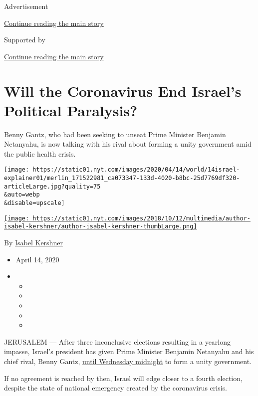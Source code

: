 Advertisement

\protect\hyperlink{after-top}{Continue reading the main story}

Supported by

\protect\hyperlink{after-sponsor}{Continue reading the main story}

\hypertarget{will-the-coronavirus-end-israels-political-paralysis}{%
\section{Will the Coronavirus End Israel's Political
Paralysis?}\label{will-the-coronavirus-end-israels-political-paralysis}}

Benny Gantz, who had been seeking to unseat Prime Minister Benjamin
Netanyahu, is now talking with his rival about forming a unity
government amid the public health crisis.

\texttt{[image: https://static01.nyt.com/images/2020/04/14/world/14israel-explainer01/merlin\_171522981\_ca073347-133d-4020-b8bc-25d7769df320-articleLarge.jpg?quality=75\\\&auto=webp\\\&disable=upscale]}

\href{https://www.nytimes.com/by/isabel-kershner}{\texttt{[image: https://static01.nyt.com/images/2018/10/12/multimedia/author-isabel-kershner/author-isabel-kershner-thumbLarge.png]}}

By \href{https://www.nytimes.com/by/isabel-kershner}{Isabel Kershner}

\begin{itemize}
\item
  April 14, 2020
\item
  \begin{itemize}
  \item
  \item
  \item
  \item
  \item
  \end{itemize}
\end{itemize}

JERUSALEM --- After three inconclusive elections resulting in a yearlong
impasse, Israel's president has given Prime Minister Benjamin Netanyahu
and his chief rival, Benny Gantz,
\href{https://www.nytimes.com/2020/04/13/world/middleeast/israel-election-netanyahu-gantz.html?action=click\&module=Latest\&pgtype=Homepage}{until
Wednesday midnight} to form a unity government.

If no agreement is reached by then, Israel will edge closer to a fourth
election, despite the state of national emergency created by the
coronavirus crisis.

